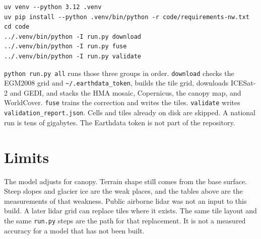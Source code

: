 \documentclass[11pt]{article}
\begin{document}
\begin{verbatim}
uv venv --python 3.12 .venv
uv pip install --python .venv/bin/python -r code/requirements-nw.txt
cd code
../.venv/bin/python -I run.py download
../.venv/bin/python -I run.py fuse
../.venv/bin/python -I run.py validate
\end{verbatim}

\texttt{python run.py all} runs those three groups in order.
\texttt{download} checks the EGM2008 grid and \texttt{\textasciitilde/.earthdata\_token}, builds the tile grid, downloads ICESat-2 and GEDI, and stacks the HMA mosaic, Copernicus, the canopy map, and WorldCover.
\texttt{fuse} trains the correction and writes the tiles.
\texttt{validate} writes \texttt{validation\_report.json}.
Cells and tiles already on disk are skipped.
A national run is tens of gigabytes.
The Earthdata token is not part of the repository.

\section{Limits}

The model adjusts for canopy.
Terrain shape still comes from the base surface.
Steep slopes and glacier ice are the weak places, and the tables above are the measurements of that weakness.
Public airborne lidar was not an input to this build.
A later lidar grid can replace tiles where it exists.
The same tile layout and the same \texttt{run.py} steps are the path for that replacement.
It is not a measured accuracy for a model that has not been built.
\end{document}
